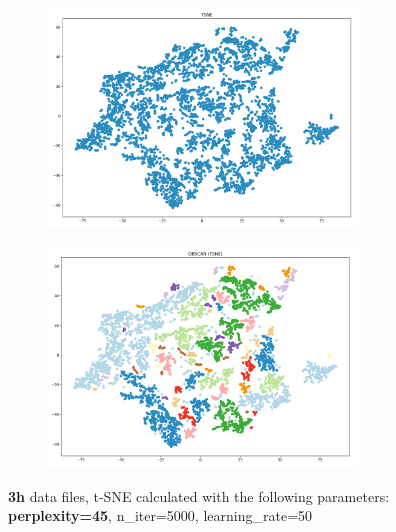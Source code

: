 \begin{figure}[H]
  \centering
	\begin{subfigure}{.5\textwidth}
    \centering
    \includegraphics[width=0.9\textwidth]{./images/tsneParametersTest/perplexity/perp45-3hTSNE.png}
  \end{subfigure}%
  \begin{subfigure}{.5\textwidth}
    \centering
    \includegraphics[width=0.9\textwidth]{./images/tsneParametersTest/perplexity/perp45-3hDBSCAN.png}
	\end{subfigure}
	\caption{\textbf{3h} data files, t-SNE calculated with the following parameters: \textbf{perplexity=45}, n\_iter=5000, learning\_rate=50}
  \label{figure:3hperp45TSNE}
\end{figure}



